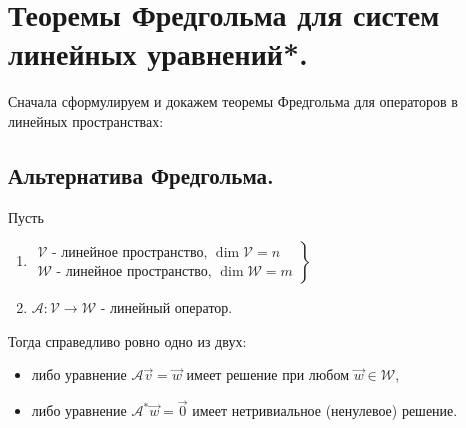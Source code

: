 \section{
    Теоремы Фредгольма для систем линейных уравнений*.
}

Сначала сформулируем и докажем теоремы Фредгольма для операторов в линейных пространствах:

\subsection{
    Альтернатива Фредгольма.
}

\begin{theorem} Пусть

    \begin{enumerate}
        \item $\left.\begin{array}{l}
            \mathcal{V} \text{ - линейное пространство, } \dim \mathcal{V} = n \\
            \mathcal{W} \text{ - линейное пространство, } \dim \mathcal{W} = m
        \end{array}\right\}$ 
        \item $\mathscr{A} \colon \mathcal{V} \to \mathcal{W}$ - линейный оператор.
    \end{enumerate}

    Тогда справедливо ровно одно из двух:

    \begin{itemize}[nosep]
        \item либо уравнение $\mathscr{A}\vec{v} = \vec{w}$ имеет решение при любом $\vec{w} \in \mathcal{W}$,
        \item либо уравнение $\mathscr{A^*}\vec{w} = \vec{0}$ имеет нетривиальное (ненулевое) решение.
    \end{itemize}
\end{theorem}

